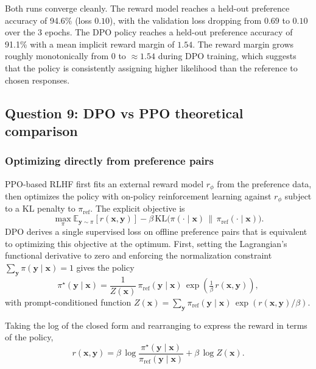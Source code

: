 \documentclass{article}
\begin{document}
Both runs converge cleanly. The reward model reaches a held-out preference
accuracy of 94.6\% (loss $0.10$), with the validation loss dropping
from $0.69$ to $0.10$ over the 3 epochs. The DPO policy
reaches a held-out preference accuracy of 91.1\% with a mean implicit
reward margin of $1.54$. The reward margin grows roughly monotonically from
$0$ to $\approx 1.54$ during DPO training, which suggests that the policy is
consistently assigning higher likelihood than the reference to chosen
responses.

\subsection*{Question 9: DPO vs PPO theoretical comparison}

\subsubsection*{Optimizing directly from preference pairs}

PPO-based RLHF first fits an external reward model $r_\phi$ from the
preference data, then optimizes the policy with on-policy reinforcement
learning against $r_\phi$ subject to a KL penalty to $\pi_\text{ref}$.
The explicit objective is
\begin{equation*}
  \max_\pi \mathbb{E}_{\mathbf{y}\sim\pi}\!\left[r(\mathbf{x},\mathbf{y})\right]
    - \beta\,\mathrm{KL}\bigl(\pi(\cdot\mid\mathbf{x})\,\|\,\pi_\text{ref}(\cdot\mid\mathbf{x})\bigr).
\end{equation*}
DPO derives a single supervised loss on offline preference pairs that is
equivalent to optimizing this objective at the optimum. First, setting the Lagrangian's functional
derivative to zero and enforcing the normalization constraint
$\sum_\mathbf{y} \pi(\mathbf{y}\mid\mathbf{x}) = 1$ gives the policy
\begin{equation*}
  \pi^\star(\mathbf{y}\mid\mathbf{x})
    = \frac{1}{Z(\mathbf{x})}\,\pi_\text{ref}(\mathbf{y}\mid\mathbf{x})\,
      \exp\!\left(\tfrac{1}{\beta}\,r(\mathbf{x},\mathbf{y})\right),
\end{equation*}
with prompt-conditioned function
$Z(\mathbf{x}) = \sum_{\mathbf{y}}\pi_\text{ref}(\mathbf{y}\mid\mathbf{x})\,\exp(r(\mathbf{x},\mathbf{y})/\beta)$.

Taking
the log of the closed form and rearranging to express the reward in terms of the policy,
\begin{equation*}
  r(\mathbf{x},\mathbf{y}) =
    \beta\,\log\!\frac{\pi^\star(\mathbf{y}\mid\mathbf{x})}{\pi_\text{ref}(\mathbf{y}\mid\mathbf{x})}
    + \beta\,\log Z(\mathbf{x}).
\end{equation*}
\end{document}
